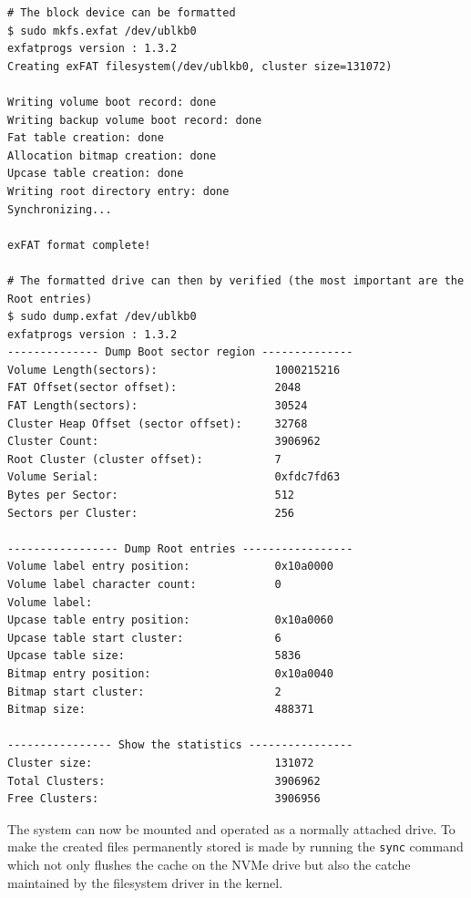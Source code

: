 
\begin{lstlisting}[caption={Formatting the created ublk device}]
# The block device can be formatted
$ sudo mkfs.exfat /dev/ublkb0
exfatprogs version : 1.3.2
Creating exFAT filesystem(/dev/ublkb0, cluster size=131072)

Writing volume boot record: done
Writing backup volume boot record: done
Fat table creation: done
Allocation bitmap creation: done
Upcase table creation: done
Writing root directory entry: done
Synchronizing...

exFAT format complete!

# The formatted drive can then by verified (the most important are the Root entries)
$ sudo dump.exfat /dev/ublkb0
exfatprogs version : 1.3.2
-------------- Dump Boot sector region --------------
Volume Length(sectors):                  1000215216
FAT Offset(sector offset):               2048
FAT Length(sectors):                     30524
Cluster Heap Offset (sector offset):     32768
Cluster Count:                           3906962
Root Cluster (cluster offset):           7
Volume Serial:                           0xfdc7fd63
Bytes per Sector:                        512
Sectors per Cluster:                     256

----------------- Dump Root entries -----------------
Volume label entry position:             0x10a0000
Volume label character count:            0
Volume label:
Upcase table entry position:             0x10a0060
Upcase table start cluster:              6
Upcase table size:                       5836
Bitmap entry position:                   0x10a0040
Bitmap start cluster:                    2
Bitmap size:                             488371

---------------- Show the statistics ----------------
Cluster size:                            131072
Total Clusters:                          3906962
Free Clusters:                           3906956
\end{lstlisting}

The system can now be mounted and operated as a normally attached drive. To make the created files
permanently stored is made by running the \verb|sync| command which not only flushes the cache on
the NVMe drive but also the catche maintained by the filesystem driver in the kernel.

